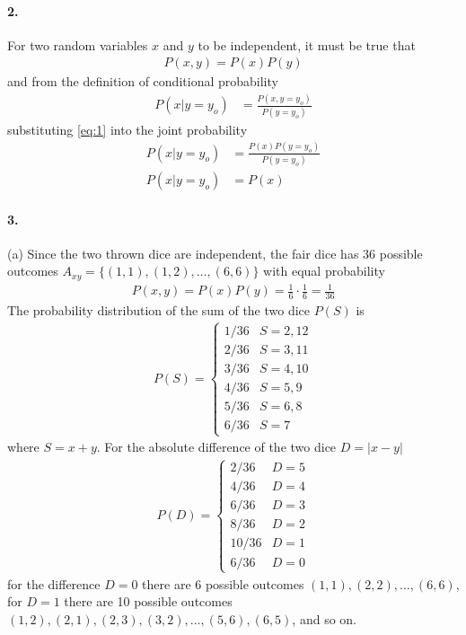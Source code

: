 \documentclass[../main.tex]{subfiles}
\begin{document}
\paragraph{2.} For two random variables $x$ and $y$ to be independent, it must be true that
\begin{align} \label{eq:1} \tag{1}
    P(x,y) = P(x)P(y)
\end{align}
and from the definition of conditional probability
\begin{align*}
    P(x|y=y_o) &= \frac{P(x,y=y_o)}{P(y=y_o)}
\end{align*}
substituting \eqref{eq:1} into the joint probability
\begin{align*}
    P(x|y=y_o) &= \frac{P(x)P(y=y_o)}{P(y=y_o)} \\
    P(x|y=y_o) &= P(x)
\end{align*}

\paragraph{3.}(a) Since the two thrown dice are independent, the fair dice has 36 possible outcomes
$A_{xy} = \{ (1,1), (1,2), \dots, (6,6) \}$ with equal probability
\begin{align*}
    P(x,y) = P(x)P(y) = \frac{1}{6} \cdot \frac{1}{6} = \frac{1}{36}
\end{align*}
The probability distribution of the sum of the two dice $P(S)$ is
\begin{align*}
    P(S) = \begin{cases}
        1/36 & S = 2, 12 \\
        2/36 & S = 3, 11 \\
        3/36 & S = 4, 10 \\
        4/36 & S = 5, 9 \\
        5/36 & S = 6, 8 \\
        6/36 & S = 7
    \end{cases}
\end{align*}
where $S = x + y$. For the absolute difference of the two dice $D = |x - y|$
\begin{align*}
    P(D) = \begin{cases}
        2/36 & D = 5 \\
        4/36 & D = 4 \\
        6/36 & D = 3 \\
        8/36 & D = 2 \\
        10/36 & D = 1 \\
        6/36 & D = 0
    \end{cases}
\end{align*}
for the difference $D = 0$ there are 6 possible outcomes $(1,1), (2,2), \dots, (6,6)$, for $D = 1$
there are 10 possible outcomes $(1,2), (2,1), (2,3), (3,2), \dots, (5,6), (6,5)$, and so on. 
\end{document}
